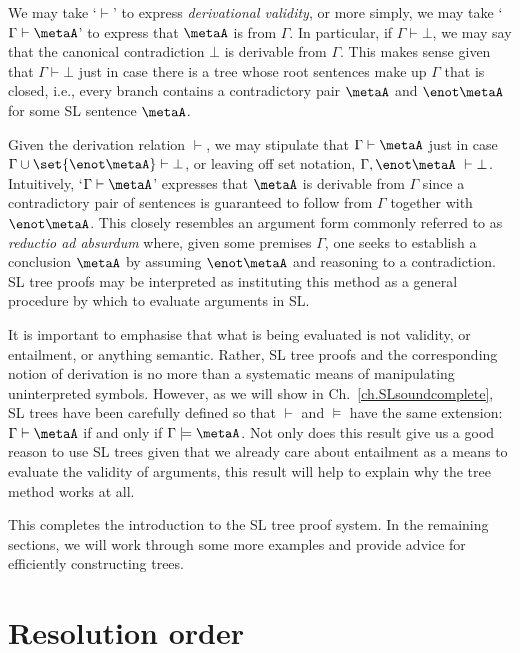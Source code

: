 We may take `$\vdash$' to express \textit{derivational validity}, or more simply, we may take `$\Gamma \vdash \metaA$' to express that $\metaA$ is  from $\Gamma$. 
In particular, if $\Gamma \vdash \bot$, we may say that the canonical contradiction $\bot$ is derivable from $\Gamma$.
This makes sense given that $\Gamma \vdash \bot$ just in case there is a tree whose root sentences make up $\Gamma$ that is closed, i.e., every branch contains a contradictory pair $\metaA$ and $\enot \metaA$ for some SL sentence $\metaA$. 

Given the derivation relation $\vdash$, we may stipulate that $\Gamma \vdash \metaA$ just in case $\Gamma \cup \set{\enot \metaA} \vdash \bot$, or leaving off set notation, $\Gamma, \enot\metaA\ \vdash \bot$.
Intuitively, `$\Gamma \vdash \metaA$' expresses that $\metaA$ is derivable from $\Gamma$ since a contradictory pair of sentences is guaranteed to follow from $\Gamma$ together with $\enot \metaA$.
This closely resembles an argument form commonly referred to as \textit{reductio ad absurdum} where, given some premises $\Gamma$, one seeks to establish a conclusion $\metaA$ by assuming $\enot \metaA$ and reasoning to a contradiction. 
SL tree proofs may be interpreted as instituting this method as a general procedure by which to evaluate arguments in SL.

It is important to emphasise that what is being evaluated is not validity, or entailment, or anything semantic.
Rather, SL tree proofs and the corresponding notion of derivation is no more than a systematic means of manipulating uninterpreted symbols.
However, as we will show in Ch.~\ref{ch.SLsoundcomplete}, SL trees have been carefully defined so that $\vdash$ and $\models$ have the same extension: $\Gamma \vdash \metaA$ if and only if $\Gamma \models \metaA$.
Not only does this result give us a good reason to use SL trees given that we already care about entailment as a means to evaluate the validity of arguments, this result will help to explain why the tree method works at all.

This completes the introduction to the SL tree proof system.
In the remaining sections, we will work through some more examples and provide advice for efficiently constructing trees.



\section{Resolution order}

